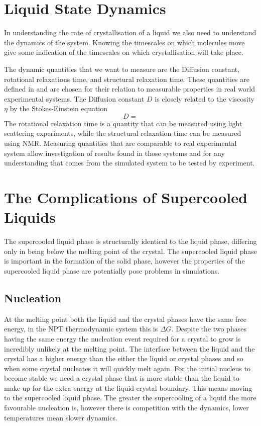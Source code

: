 \section{Liquid State Dynamics}

In understanding the rate of crystallisation of a liquid we also need to understand the dynamics of the system. Knowing the timescales on which molecules move give some indication of the timescales on which crystallisation will take place.

The dynamic quantities that we want to measure are the Diffusion constant, rotational relaxations time, and structural relaxation time. These quantities are defined in  and are chosen for their relation to measurable properties in real world experimental systems. The Diffusion constant $D$ is closely related to the viscosity $\eta$ by the Stokes-Einstein equation
\begin{equation}
    D =
\end{equation}
The rotational relaxation time is a quantity that can be measured using light scattering experiments, while the structural relaxation time can be measured using NMR. Measuring quantities that are comparable to real experimental system allow investigation of results found in those systems and for any understanding that comes from the simulated system to be tested by experiment.

\section{The Complications of Supercooled Liquids}

The supercooled liquid phase is structurally identical to the liquid phase, differing only in being below the melting point of the crystal. The supercooled liquid phase is important in the formation of the solid phase, however the properties of the supercooled liquid phase are potentially pose problems in simulations.

\subsection{Nucleation}

At the melting point both the liquid and the crystal phases have the same free energy, in the NPT thermodynamic system this is $\Delta G$. Despite the two phases having the same energy the nucleation event required for a crystal to grow is incredibly unlikely at the melting point. The interface between the liquid and the crystal has a higher energy than the either the liquid or crystal phases and so when some crystal nucleates it will quickly melt again. For the initial nucleus to become stable we need a crystal phase that is more stable than the liquid to make up for the extra energy at the liquid-crystal boundary. This means moving to the supercooled liquid phase. The greater the supercooling of a liquid the more favourable nucleation is, however there is competition with the dynamics, lower temperatures mean slower dynamics.

